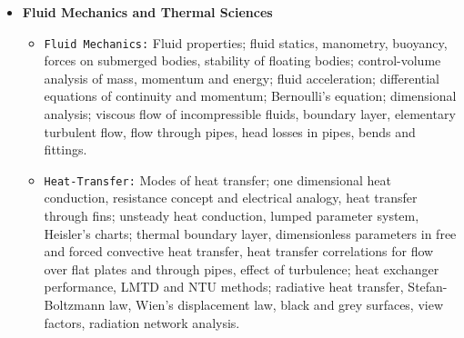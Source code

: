 \documentclass{article}
\begin{document}
{\begin{multicols}{2}
\begin{itemize}
\begin{itemize}
\item \texttt{Mechanics of Materials:} Stress and strain, elastic constants, Poisson's ratio; Mohr’s circle for plane stress and plane strain; thin cylinders; shear force and bending moment diagrams; bending and shear stresses; deflection of beams; torsion of circular shafts; Euler’s theory of columns; energy methods; thermal stresses; strain gauges and rosettes; testing of materials with universal testing machine; testing of hardness and impact strength.
\item \texttt{Theory of Machines:} Displacement, velocity and acceleration analysis of plane mechanisms; dynamic analysis of linkages; cams; gears and gear trains; flywheels and governors; balancing of reciprocating and rotating masses; gyroscope.
\item \texttt{Vibrations:} Free and forced vibration of single degree of freedom systems, effect of damping; vibration isolation; resonance; critical speeds of shafts.
\item \texttt{Machine Design:} Design for static and dynamic loading; failure theories; fatigue strength and the S-N diagram; principles of the design of machine elements such as bolted, riveted and welded joints; shafts, gears, rolling and sliding contact bearings, brakes and clutches, springs.
\end{itemize}
\item \textbf{Fluid Mechanics and Thermal Sciences}
\begin{itemize}
\item \texttt{Fluid Mechanics:} Fluid properties; fluid statics, manometry, buoyancy, forces on submerged bodies, stability of floating bodies; control-volume analysis of mass, momentum and energy; fluid acceleration; differential equations of continuity and momentum; Bernoulli’s equation; dimensional analysis; viscous flow of incompressible fluids, boundary layer, elementary turbulent flow, flow through pipes, head losses in pipes, bends and fittings.
\item \texttt{Heat-Transfer:} Modes of heat transfer; one dimensional heat conduction, resistance concept and electrical analogy, heat transfer through fins; unsteady heat conduction, lumped parameter system, Heisler's charts; thermal boundary layer, dimensionless parameters in free and forced convective heat transfer, heat transfer correlations for flow over flat plates and through pipes, effect of turbulence; heat exchanger performance, LMTD and NTU methods; radiative heat transfer, Stefan-Boltzmann law, Wien's displacement law, black and grey surfaces, view factors, radiation network analysis.

\end{itemize}
\end{itemize}
\end{multicols}}
\end{document}
